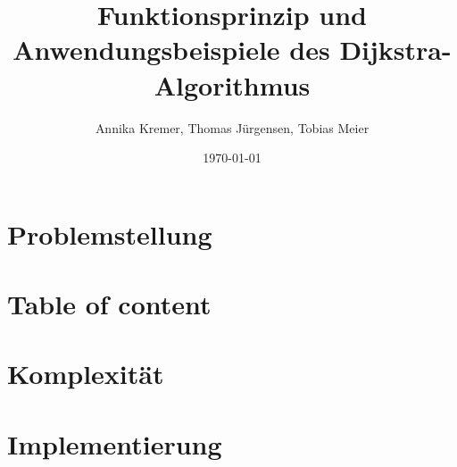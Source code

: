 \documentclass{beamer}
\title{Funktionsprinzip und Anwendungsbeispiele des Dijkstra-Algorithmus}
\author{Annika Kremer, Thomas Jürgensen, Tobias Meier}
\date{\today}
\institute{Fachhochschule Trier}
\begin{document}
\maketitle

\section{Problemstellung}


\section*{Table of content}
\begin{frame}
	\tableofcontents
\end{frame}






\section{Komplexität}


\section{Implementierung}





\end{document}
